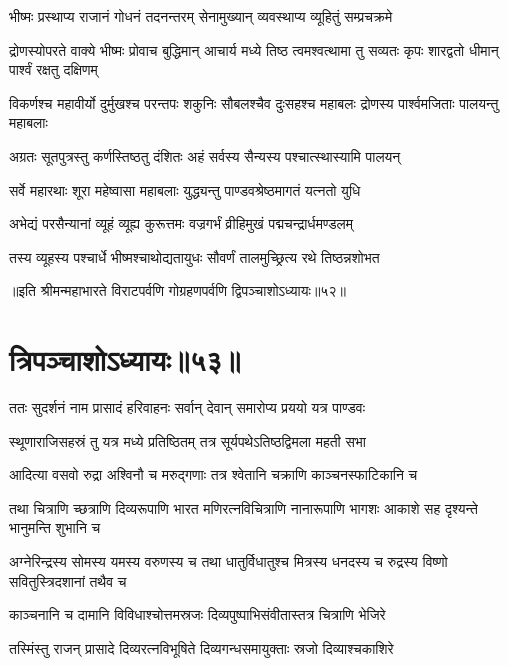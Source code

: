 \twolineshloka
{भीष्मः प्रस्थाप्य राजानं गोधनं तदनन्तरम्}
{सेनामुख्यान् व्यवस्थाप्य व्यूहितुं सम्प्रचक्रमे}


\threelineshloka
{द्रोणस्योपरते वाक्ये भीष्मः प्रोवाच बुद्धिमान्}
{आचार्य मध्ये तिष्ठ त्वमश्वत्थामा तु सव्यतः}
{कृपः शारद्वतो धीमान् पार्श्वं रक्षतु दक्षिणम्}


\threelineshloka
{विकर्णश्च महावीर्यो दुर्मुखश्च परन्तपः}
{शकुनिः सौबलश्चैव दुःसहश्च महाबलः}
{द्रोणस्य पार्श्वमजिताः पालयन्तु महाबलाः}


\twolineshloka
{अग्रतः सूतपुत्रस्तु कर्णस्तिष्ठतु दंशितः}
{अहं सर्वस्य सैन्यस्य पश्चात्स्थास्यामि पालयन्}


\twolineshloka
{सर्वे महारथाः शूरा महेष्वासा महाबलाः}
{युद्ध्यन्तु पाण्डवश्रेष्ठमागतं यत्नतो युधि}



\twolineshloka
{अभेद्यं परसैन्यानां व्यूहं व्यूह्य कुरूत्तमः}
{वज्रगर्भं व्रीहिमुखं पद्मचन्द्रार्धमण्डलम्}


\twolineshloka
{तस्य व्यूहस्य पश्चार्धे भीष्मश्चाथोद्यतायुधः}
{सौवर्णं तालमुच्छ्रित्य रथे तिष्ठन्नशोभत}

॥इति श्रीमन्महाभारते विराटपर्वणि गोग्रहणपर्वणि द्विपञ्चाशोऽध्यायः॥५२॥

\chapter{त्रिपञ्चाशोऽध्यायः॥५३॥}

\twolineshloka
{ततः सुदर्शनं नाम प्रासादं हरिवाहनः}
{सर्वान् देवान् समारोप्य प्रययो यत्र पाण्डवः}


\twolineshloka
{स्थूणाराजिसहस्रं तु यत्र मध्ये प्रतिष्ठितम्}
{तत्र सूर्यपथेऽतिष्ठद्विमला महती सभा}


\twolineshloka
{आदित्या वसवो रुद्रा अश्विनौ च मरुद्गणाः}
{तत्र श्वेतानि चक्राणि काञ्चनस्फाटिकानि च}


\threelineshloka
{तथा चित्राणि च्छत्राणि दिव्यरूपाणि भारत}
{मणिरत्नविचित्राणि नानारूपाणि भागशः}
{आकाशे सह दृश्यन्ते भानुमन्ति शुभानि च}


\threelineshloka
{अग्नेरिन्द्रस्य सोमस्य यमस्य वरुणस्य च}
{तथा धातुर्विधातुश्च मित्रस्य धनदस्य च}
{रुद्रस्य विष्णो सवितुस्त्रिदशानां तथैव च}


\twolineshloka
{काञ्चनानि च दामानि विविधाश्चोत्तमस्रजः}
{दिव्यपुष्पाभिसंवीतास्तत्र चित्राणि भेजिरे}


\twolineshloka
{तस्मिंस्तु राजन् प्रासादे दिव्यरत्नविभूषिते}
{दिव्यगन्धसमायुक्ताः स्रजो दिव्याश्चकाशिरे}



